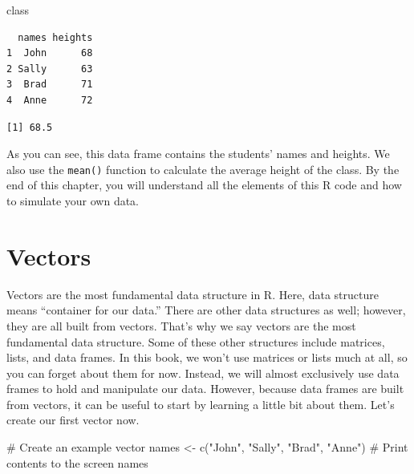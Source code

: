 \documentclass[
  letterpaper,
  DIV=11,
  numbers=noendperiod]{scrreprt}
\newenvironment{Shaded}{\begin{snugshade}}{\end{snugshade}}
\newcommand{\CommentTok}[1]{\textcolor[rgb]{0.37,0.37,0.37}{#1}}
\newcommand{\FunctionTok}[1]{\textcolor[rgb]{0.28,0.35,0.67}{#1}}
\newcommand{\NormalTok}[1]{\textcolor[rgb]{0.00,0.23,0.31}{#1}}
\newcommand{\OtherTok}[1]{\textcolor[rgb]{0.00,0.23,0.31}{#1}}
\newcommand{\SpecialCharTok}[1]{\textcolor[rgb]{0.37,0.37,0.37}{#1}}
\newcommand{\StringTok}[1]{\textcolor[rgb]{0.13,0.47,0.30}{#1}}
\begin{document}
\begin{Shaded}
\begin{Highlighting}[]
\NormalTok{class}
\end{Highlighting}
\end{Shaded}

\begin{verbatim}
  names heights
1  John      68
2 Sally      63
3  Brad      71
4  Anne      72
\end{verbatim}

\begin{Shaded}
\end{Shaded}

\begin{verbatim}
[1] 68.5
\end{verbatim}

As you can see, this data frame contains the students' names and
heights. We also use the \texttt{mean()} function to calculate the
average height of the class. By the end of this chapter, you will
understand all the elements of this R code and how to simulate your own
data.

\section{Vectors}\label{vectors}

Vectors are the most fundamental data structure in R. Here, data
structure means ``container for our data.'' There are other data
structures as well; however, they are all built from vectors. That's why
we say vectors are the most fundamental data structure. Some of these
other structures include matrices, lists, and data frames. In this book,
we won't use matrices or lists much at all, so you can forget about them
for now. Instead, we will almost exclusively use data frames to hold and
manipulate our data. However, because data frames are built from
vectors, it can be useful to start by learning a little bit about them.
Let's create our first vector now.

\begin{Shaded}
\begin{Highlighting}[]
\CommentTok{\# Create an example vector}
\NormalTok{names }\OtherTok{\textless{}{-}} \FunctionTok{c}\NormalTok{(}\StringTok{"John"}\NormalTok{, }\StringTok{"Sally"}\NormalTok{, }\StringTok{"Brad"}\NormalTok{, }\StringTok{"Anne"}\NormalTok{)}
\CommentTok{\# Print contents to the screen}
\NormalTok{names}
\end{Highlighting}
\end{Shaded}
\end{document}
